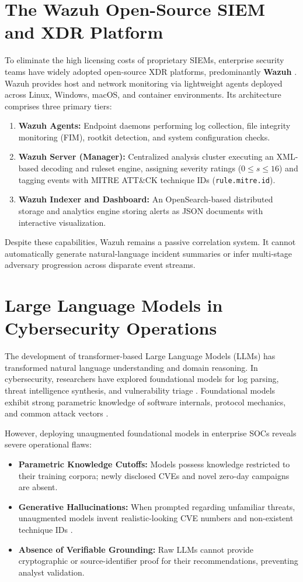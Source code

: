 \section{The Wazuh Open-Source SIEM and XDR Platform}
\label{sec:lit_wazuh}
To eliminate the high licensing costs of proprietary SIEMs, enterprise security teams have widely adopted open-source XDR platforms, predominantly \textbf{Wazuh} \cite{wazuh_siem_xdr}. Wazuh provides host and network monitoring via lightweight agents deployed across Linux, Windows, macOS, and container environments. Its architecture comprises three primary tiers:
\begin{enumerate}
  \item \textbf{Wazuh Agents:} Endpoint daemons performing log collection, file integrity monitoring (FIM), rootkit detection, and system configuration checks.
  \item \textbf{Wazuh Server (Manager):} Centralized analysis cluster executing an XML-based decoding and ruleset engine, assigning severity ratings ($0 \le s \le 16$) and tagging events with MITRE ATT\&CK technique IDs (\texttt{rule.mitre.id}).
  \item \textbf{Wazuh Indexer and Dashboard:} An OpenSearch-based distributed storage and analytics engine storing alerts as JSON documents with interactive visualization.
\end{enumerate}
Despite these capabilities, Wazuh remains a passive correlation system. It cannot automatically generate natural-language incident summaries or infer multi-stage adversary progression across disparate event streams.

\section{Large Language Models in Cybersecurity Operations}
\label{sec:lit_llm_cyber}
The development of transformer-based Large Language Models (LLMs) \cite{vaswani2017attention} has transformed natural language understanding and domain reasoning. In cybersecurity, researchers have explored foundational models for log parsing, threat intelligence synthesis, and vulnerability triage \cite{ferrag2024generativeai}. Foundational models exhibit strong parametric knowledge of software internals, protocol mechanics, and common attack vectors \cite{albert2023copilot}.

However, deploying unaugmented foundational models in enterprise SOCs reveals severe operational flaws:
\begin{itemize}
  \item \textbf{Parametric Knowledge Cutoffs:} Models possess knowledge restricted to their training corpora; newly disclosed CVEs and novel zero-day campaigns are absent.
  \item \textbf{Generative Hallucinations:} When prompted regarding unfamiliar threats, unaugmented models invent realistic-looking CVE numbers and non-existent technique IDs \cite{ferrag2024generativeai}.
  \item \textbf{Absence of Verifiable Grounding:} Raw LLMs cannot provide cryptographic or source-identifier proof for their recommendations, preventing analyst validation.
\end{itemize}

